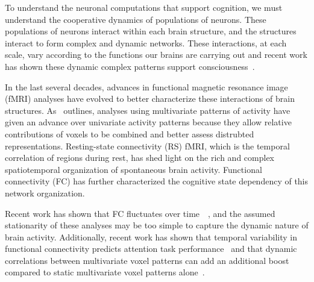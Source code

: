 To understand the neuronal computations that support cognition, we
must understand the cooperative dynamics of populations of neurons.
These populations of neurons interact within each brain structure, and
the structures interact to form complex and dynamic networks. These
interactions, at each scale, vary according to the functions our
brains are carrying out and recent work has shown these dynamic
complex patterns support consciousness~\citep{DemeEtal19}.

In the last several decades, advances in functional magnetic resonance
image (fMRI) analyses have evolved to better characterize these
interactions of brain structures.  As~\cite{Turk13} outlines,
analyses using multivariate patterns of activity have given an advance
over univariate activity patterns because they allow relative
contributions of voxels to be combined and better assess distrubted
representations. Resting-state connectivity (RS) fMRI, which is the
temporal correlation of regions during rest, has shed light on the
rich and complex spatiotemporal organization of spontaneous brain
activity.  Functional connectivity (FC) has further characterized the
cognitive state dependency of this network organization.

Recent work has shown that FC fluctuates over time~\citep{ChanGlov10}~\citep[for review]{LuriEtal18}, and the assumed stationarity of these analyses may be too
simple to capture the dynamic nature of brain activity.  Additionally,
recent work has shown that temporal
variability in functional connectivity predicts attention task
performance~\citep{FongEtal19} and that
dynamic correlations between multivariate voxel patterns can add an
additional boost compared to static multivariate voxel patterns alone~\citep{MannEtal18}.




